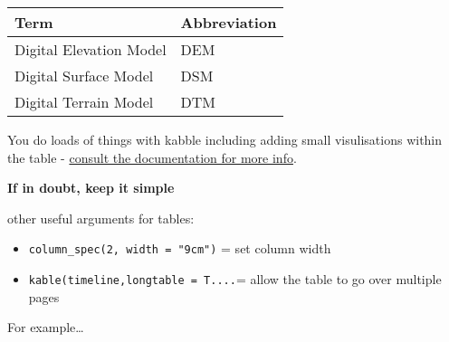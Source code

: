\documentclass[
  12pt,
  oneside]{book}
\begin{document}
\begin{table}[H]
\centering
\begin{tabular}{ll}
\toprule
\textbf{Term} & \textbf{Abbreviation}\\
\midrule
Digital Elevation Model & DEM\\
Digital Surface Model & DSM\\
Digital Terrain Model & DTM\\
\bottomrule
\end{tabular}
\end{table}

You do loads of things with kabble including adding small visulisations within the table - \href{https://cran.r-project.org/web/packages/kableExtra/vignettes/awesome_table_in_html.html\#Overview}{consult the documentation for more info}.

\textbf{If in doubt, keep it simple}

other useful arguments for tables:

\begin{itemize}
\item
  \texttt{column\_spec(2,\ width\ =\ "9cm")} = set column width
\item
  \texttt{kable(timeline,longtable\ =\ T....}= allow the table to go over multiple pages
\end{itemize}

For example\ldots{}
\newpage
\end{document}
